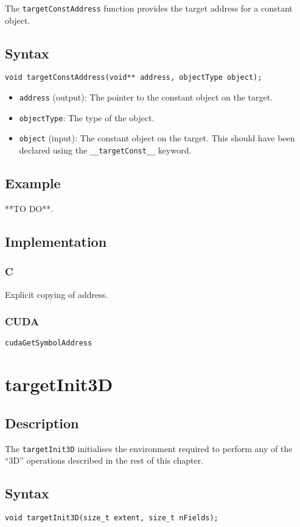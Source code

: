 The \verb+targetConstAddress+ function provides the target address for a constant object.

\subsection{Syntax}
\begin{verbatim}
void targetConstAddress(void** address, objectType object);
\end{verbatim}

\begin{itemize}
\item \verb+address+ (output): The pointer to the constant object on the target.
\item \verb+objectType+: The type of the object.
\item \verb+object+ (input): The constant object on the target. This should have been declared using the \verb+__targetConst__+ keyword.
\end{itemize}


\subsection{Example}
**TO DO**.

\subsection{Implementation}
\subsubsection{C}
Explicit copying of address.
\subsubsection{CUDA}
\verb+cudaGetSymbolAddress+

\newpage
\section{targetInit3D}

\subsection{Description}

The \verb+targetInit3D+ initialises the environment required to perform any of the ``3D'' operations described in the rest of this chapter.

\subsection{Syntax}
\begin{verbatim}
void targetInit3D(size_t extent, size_t nFields);
\end{verbatim}

